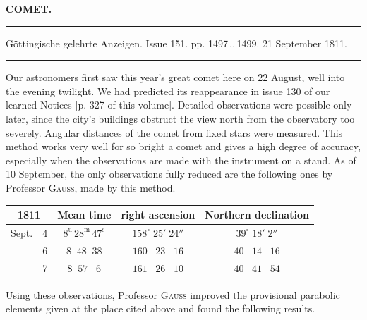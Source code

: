\clearpage{}\hypertarget{native-342-lower}{}\label{native-342-lower}
\begin{center}\textbf{COMET.}\par\vspace{4pt}\hrule\vspace{4pt}\fontsize{10}{12}\selectfont Göttingische gelehrte Anzeigen. Issue 151. pp. 1497\,..\,1499. 21 September 1811.\par\vspace{4pt}\hrule\vspace{4pt}\end{center}

\par\indent Our astronomers first saw this year’s great comet here on 22 August, well into the evening twilight. We had predicted its reappearance in issue 130 of our learned Notices [p. 327 of this volume]. Detailed observations were possible only later, since the city’s buildings obstruct the view north from the observatory too severely. Angular distances of the comet from fixed stars were measured. This method works very well for so bright a comet and gives a high degree of accuracy, especially when the observations are made with the instrument on a stand. As of 10 September, the only observations fully reduced are the following ones by Professor \textsc{Gauss}, made by this method.

\begin{center}\fontsize{10}{12}\selectfont\setlength{\tabcolsep}{4pt}\renewcommand{\arraystretch}{1.15}\begin{tabular}{ll|c|c|c}
\multicolumn{2}{c|}{1811} & Mean time & right ascension & Northern declination \\\hline
Sept. & 4 & $8^{\mathrm u}\,28^{\mathrm m}\,47^{\mathrm s}$ & $158^\circ\;25'\;24''$ & $39^\circ\;18'\;2''$ \\
 & 6 & $8\;\;48\;\;38$ & $160\;\;\;23\;\;\;16$ & $40\;\;\;14\;\;\;16$ \\
 & 7 & $8\;\;57\;\;\;6$ & $161\;\;\;26\;\;\;10$ & $40\;\;\;41\;\;\;54$ \\
\end{tabular}
\end{center}

\par\indent Using these observations, Professor \textsc{Gauss} improved the provisional parabolic elements given at the place cited above and found the following results.

